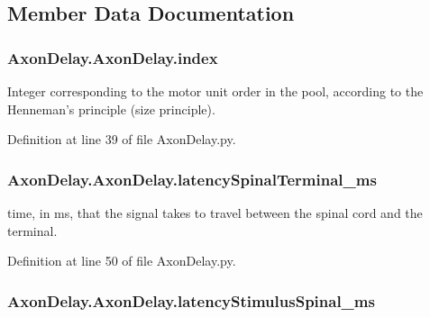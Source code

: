 \subsection{Member Data Documentation}
\hypertarget{class_axon_delay_1_1_axon_delay_a5dbb9b5002d4b54bf347f48337bdb1c6}{
\subsubsection[{index}]{\setlength{\rightskip}{0pt plus 5cm}Axon\-Delay.\-Axon\-Delay.\-index}}\label{class_axon_delay_1_1_axon_delay_a5dbb9b5002d4b54bf347f48337bdb1c6}


Integer corresponding to the motor unit order in the pool, according to the Henneman's principle (size principle). 



Definition at line 39 of file Axon\-Delay.\-py.

\hypertarget{class_axon_delay_1_1_axon_delay_aaa0b8daf2629cd7fa19d539fe2168d0f}{
\subsubsection[{latency\-Spinal\-Terminal\-\_\-ms}]{\setlength{\rightskip}{0pt plus 5cm}Axon\-Delay.\-Axon\-Delay.\-latency\-Spinal\-Terminal\-\_\-ms}}\label{class_axon_delay_1_1_axon_delay_aaa0b8daf2629cd7fa19d539fe2168d0f}


time, in ms, that the signal takes to travel between the spinal cord and the terminal. 



Definition at line 50 of file Axon\-Delay.\-py.

\hypertarget{class_axon_delay_1_1_axon_delay_a81ea09febed911b8f5e4d56a5f434f8d}{
\subsubsection[{latency\-Stimulus\-Spinal\-\_\-ms}]{\setlength{\rightskip}{0pt plus 5cm}Axon\-Delay.\-Axon\-Delay.\-latency\-Stimulus\-Spinal\-\_\-ms}}\label{class_axon_delay_1_1_axon_delay_a81ea09febed911b8f5e4d56a5f434f8d}


